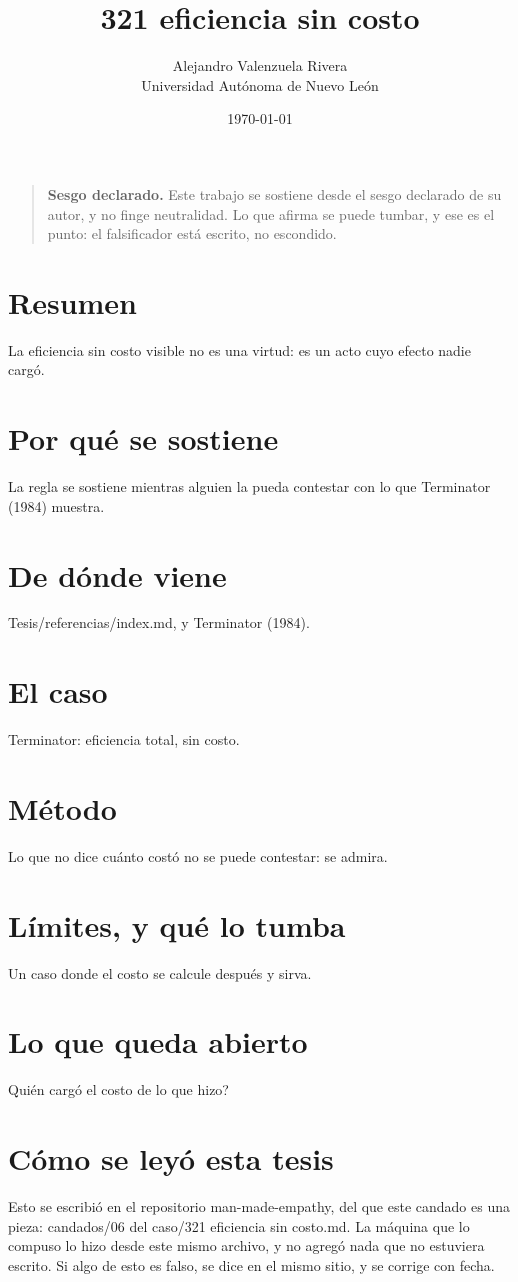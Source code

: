 \documentclass[11pt,a4paper]{article}
\title{321 eficiencia sin costo}
\author{Alejandro Valenzuela Rivera\\\small Universidad Autónoma de Nuevo León}
\date{\today}
\begin{document}
\maketitle

\begin{quote}
\textbf{Sesgo declarado.} Este trabajo se sostiene desde el sesgo declarado de su autor, y no finge neutralidad. Lo que afirma se puede tumbar, y ese es el punto: el falsificador está escrito, no escondido.
\end{quote}

\section*{Resumen}
La eficiencia sin costo visible no es una virtud: es un acto cuyo efecto nadie cargó.

\section{Por qué se sostiene}
La regla se sostiene mientras alguien la pueda contestar con lo que Terminator (1984) muestra.

\section{De dónde viene}
Tesis/referencias/index.md, y Terminator (1984).

\section{El caso}
Terminator: eficiencia total, sin costo.

\section{Método}
Lo que no dice cuánto costó no se puede contestar: se admira.

\section{Límites, y qué lo tumba}
Un caso donde el costo se calcule después y sirva.

\section{Lo que queda abierto}
\textquestiondown{}Quién cargó el costo de lo que hizo?

\section*{Cómo se leyó esta tesis}
Esto se escribió en el repositorio man-made-empathy, del que este candado es una pieza: candados/06 del caso/321 eficiencia sin costo.md. La máquina que lo compuso lo hizo desde este mismo archivo, y no agregó nada que no estuviera escrito. Si algo de esto es falso, se dice en el mismo sitio, y se corrige con fecha.
\end{document}
